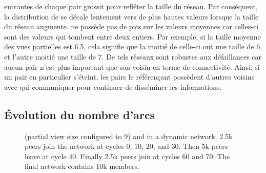 \begin{itemize}
  entrantes de chaque pair grossit pour refléter la taille du réseau. Par
  conséquent, la distribution de \SPRAY se décale lentement vers de plus hautes
  valeurs lorsque la taille du réseau augmente. \SPRAY ne possède pas de pics
  sur les valeurs moyennes car celles-ci sont des valeurs qui tombent entre deux
  entiers. Par exemple, si la taille moyenne des vues partielles est 6.5, cela
  signifie que la moitié de celle-ci ont une taille de 6, et l'autre moitié une
  taille de 7. De tels réseaux sont robustes aux défaillances car aucun pair
  n'est plus important que son voisin en terme de connectivité. Ainsi, si un
  pair en particulier s'éteint, les pairs le référençant possèdent d'autres
  voisins avec qui communiquer pour continuer de disséminer les informations.
\end{itemize}

\subsection{Évolution du nombre d'arcs}

\begin{figure}
  \centering
  \hspace{10pt}
  \caption{\label{fig:spray:churn}\CYCLON (partial view size configured to 9)
    and \SPRAY in a dynamic network. 2.5k peers join the network at cycles $0$,
    $10$, $20$, and $30$. Then 5k peers leave at cycle $40$. Finally 2.5k peers
    join at cycles $60$ and $70$. The final network contains 10k members.}
\end{figure}

